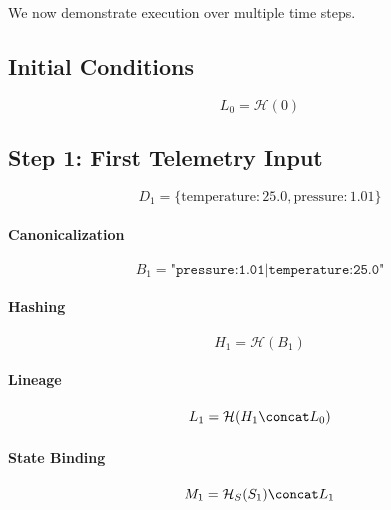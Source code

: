 We now demonstrate execution over multiple time steps.

\subsection{Initial Conditions}

\begin{equation}
L_0 = \mathcal{H}(0)
\end{equation}

\subsection{Step 1: First Telemetry Input}

\begin{equation}
D_1 = \{\text{temperature}: 25.0, \text{pressure}: 1.01\}
\end{equation}

\paragraph{Canonicalization}

\begin{equation}
B_1 = \texttt{"pressure:1.01|temperature:25.0"}
\end{equation}

\paragraph{Hashing}

\begin{equation}
H_1 = \mathcal{H}(B_1)
\end{equation}

\paragraph{Lineage}

\begin{equation}
L_1 = \mathcal{H}(H_1 \concat L_0)
\end{equation}

\paragraph{State Binding}

\begin{equation}
M_1 = \mathcal{H}_S(S_1) \concat L_1
\end{equation}

